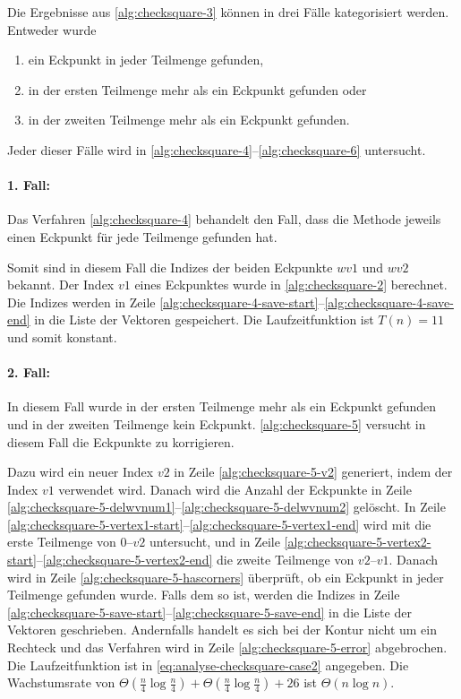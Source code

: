 Die Ergebnisse aus \autoref{alg:checksquare-3} können in drei Fälle kategorisiert werden. Entweder wurde
\begin{enumerate}
	\item ein Eckpunkt in jeder Teilmenge gefunden, \label{enum:checksquare-case1}
	\item in der ersten Teilmenge mehr als ein Eckpunkt gefunden oder \label{enum:checksquare-case2}
	\item in der zweiten Teilmenge mehr als ein Eckpunkt gefunden. \label{enum:checksquare-case3}
\end{enumerate}
Jeder dieser Fälle wird in \autoref{alg:checksquare-4}--\autoref{alg:checksquare-6} untersucht.

\paragraph{1. Fall:} %
\label{par:1_fall}
Das Verfahren \autoref{alg:checksquare-4} behandelt den Fall, dass die Methode  jeweils einen
 Eckpunkt für jede Teilmenge gefunden hat.

Somit sind in diesem Fall die Indizes der beiden Eckpunkte $\mathit{wv1}$ und $\mathit{wv2}$ bekannt. Der Index
 $\mathit{v1}$ eines Eckpunktes wurde in \autoref{alg:checksquare-2} berechnet. Die Indizes werden in Zeile
 \ref{alg:checksquare-4-save-start}--\ref{alg:checksquare-4-save-end} in die Liste der Vektoren gespeichert. Die Laufzeitfunktion ist $T(n) = 11$ und somit konstant.

\paragraph{2. Fall:} %
\label{par:2_fall}
In diesem Fall wurde in der ersten Teilmenge mehr als ein Eckpunkt gefunden und in der zweiten Teilmenge kein Eckpunkt.
 \autoref{alg:checksquare-5} versucht in diesem Fall die Eckpunkte zu korrigieren.

Dazu wird ein neuer Index $\mathit{v2}$ in Zeile \ref{alg:checksquare-5-v2} generiert, indem der Index $\mathit{v1}$
 verwendet wird. Danach wird die Anzahl der Eckpunkte in Zeile
 \ref{alg:checksquare-5-delwvnum1}--\ref{alg:checksquare-5-delwvnum2} gelöscht. In Zeile
 \ref{alg:checksquare-5-vertex1-start}--\ref{alg:checksquare-5-vertex1-end} wird mit  die erste
 Teilmenge von $0$--$\mathit{v2}$ untersucht, und in Zeile
  \ref{alg:checksquare-5-vertex2-start}--\ref{alg:checksquare-5-vertex2-end} die zweite Teilmenge von
 $\mathit{v2}$--$\mathit{v1}$. Danach wird in Zeile \ref{alg:checksquare-5-hascorners} überprüft, ob ein Eckpunkt in
 jeder Teilmenge gefunden wurde. Falls dem so ist, werden die Indizes in Zeile
 \ref{alg:checksquare-5-save-start}--\ref{alg:checksquare-5-save-end} in die Liste der Vektoren geschrieben. Andernfalls
 handelt es sich bei der Kontur nicht um ein Rechteck und das Verfahren wird in Zeile \ref{alg:checksquare-5-error}
 abgebrochen. Die Laufzeitfunktion ist in \autoref{eq:analyse-checksquare-case2} angegeben. Die Wachstumsrate von
 $\Theta(\frac{n}{4} \log \frac{n}{4}) + \Theta(\frac{n}{4} \log \frac{n}{4}) + 26$ ist $\Theta(n \log n)$.


